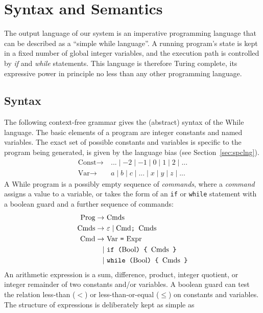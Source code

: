 \documentclass[a4paper,twoside,notitlepage]{report}
\newcommand{\ttt}{\texttt}
\newcommand{\trm}{\textrm}
\begin{document}
\section{Syntax and Semantics}

The output language of our system is an imperative programming language that 
can be described as a ``simple while language''. A running program's state is 
kept in a fixed number of global integer variables, and the execution path is 
controlled by \emph{if} and \emph{while} statements. This language is 
therefore Turing complete, its expressive power in principle no less than any 
other programming language.

\subsection{Syntax}
The following context-free grammar gives the (abstract) syntax of the While 
language. The basic elements of a program are integer constants and named 
variables. The exact set of possible constants and variables is specific to 
the program being generated, is given by the language bias (see 
Section~\ref{sec:spclng}).
\begin{align*}
   \trm{Const} \to\ & ... \mid -2 \mid -1 \mid 0 \mid 1 \mid 2 \mid ...
\\ \trm{Var}   \to\ & a \mid b \mid c \mid ... \mid x \mid y \mid z \mid ...
\end{align*}
A While program is a possibly empty sequence of \emph{commands}, where a 
\emph{command} assigns a value to a variable, or takes the form of an \ttt{if} 
or \ttt{while} statement with a boolean guard and a further sequence of 
commands:
\begin{align*}
   \trm{Prog}  \to\ & \trm{Cmds}
\\ \trm{Cmds}  \to\ & \varepsilon \mid \trm{Cmd} \ttt{; } \trm{Cmds}
\\ \trm{Cmd}   \to\ & \trm{Var} \ \ttt{=} \ \trm{Expr}
\\            \mid\ & \ttt{if (} \trm{Bool} \ttt{) \char`\{\ } \trm{Cmds} \ttt{ \char`\}}
\\            \mid\ & \ttt{while (} \trm{Bool} \ttt{) \char`\{\ } \trm{Cmds} \ttt{ \char`\}}
\end{align*}
An arithmetic expression is a sum, difference, product, integer quotient, or 
integer remainder of two constants and/or variables. A boolean guard can test 
the relation less-than ($<$) or less-than-or-equal ($\leq$) on constants and 
variables. The structure of expressions is deliberately kept as simple as 
\end{document}
